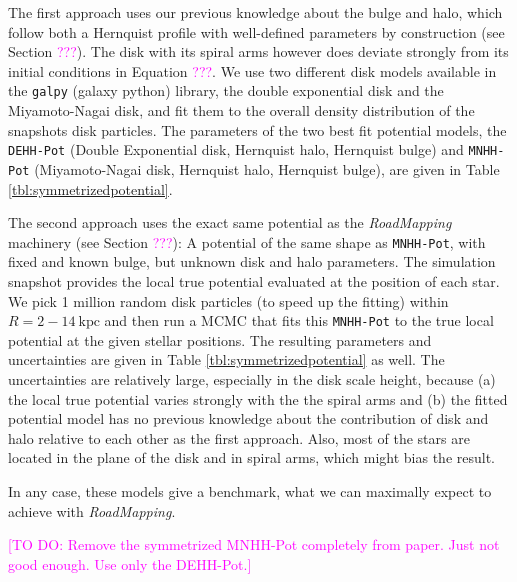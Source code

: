 \documentclass[iop,revtex4,numberedappendix,appendixfloats]{emulateapj}
\newcommand{\RM}{{\sl RoadMapping}}
\newcommand{\Wilma}[1]{\textcolor{Magenta}{#1}}
\begin{document}
The first approach uses our previous knowledge about the bulge and halo, which follow both a Hernquist profile with well-defined parameters by construction (see Section \Wilma{???}). The disk with its spiral arms however does deviate strongly from its initial conditions in Equation \Wilma{???}. We use two different disk models available in the \texttt{galpy} (galaxy python) library, the double exponential disk and the Miyamoto-Nagai disk, and fit them to the overall density distribution of the snapshots disk particles. The parameters of the two best fit potential models, the \texttt{DEHH-Pot} (Double Exponential disk, Hernquist halo, Hernquist bulge) and \texttt{MNHH-Pot} (Miyamoto-Nagai disk, Hernquist halo, Hernquist bulge), are given in Table \ref{tbl:symmetrizedpotential}.

The second approach uses the exact same potential as the \RM{} machinery (see Section \Wilma{???}): A potential of the same shape as \texttt{MNHH-Pot}, with fixed and known bulge, but unknown disk and halo parameters. The simulation snapshot provides the local true potential evaluated at the position of each star. We pick 1 million random disk particles (to speed up the fitting) within $R=2-14~\text{kpc}$ and then run a MCMC that fits this \texttt{MNHH-Pot} to the true local potential at the given stellar positions. The resulting parameters and uncertainties are given in Table \ref{tbl:symmetrizedpotential} as well. The uncertainties are relatively large, especially in the disk scale height, because (a) the local true potential varies strongly with the the spiral arms and (b) the fitted potential model has no previous knowledge about the contribution of disk and halo relative to each other as the first approach. Also, most of the stars are located in the plane of the disk and in spiral arms, which might bias the result. 

In any case, these models give a benchmark, what we can maximally expect to achieve with \RM{}.

\Wilma{[TO DO: Remove the symmetrized MNHH-Pot completely from paper. Just not good enough. Use only the DEHH-Pot.]}
\end{document}
